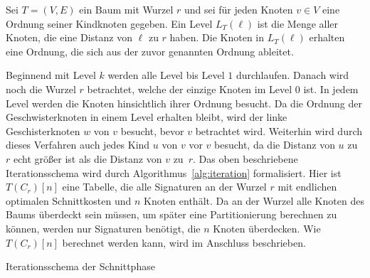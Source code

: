 \begin{defn}[Level]\label{def:level}
    Sei $T = (V,E)$ ein Baum mit Wurzel $r$ und sei für jeden Knoten $v \in V$ eine Ordnung seiner Kindknoten gegeben.
    Ein Level $L_T(\ell)$ ist die Menge aller Knoten, die eine Distanz von $\ell$ zu $r$ haben.
    Die Knoten in $L_T(\ell)$ erhalten eine Ordnung, die sich aus der zuvor genannten Ordnung ableitet.
\end{defn}

Beginnend mit Level $k$ werden alle Level bis Level $1$ durchlaufen.
Danach wird noch die Wurzel $r$ betrachtet, welche der einzige Knoten im Level $0$ ist. 
In jedem Level werden die Knoten hinsichtlich ihrer Ordnung besucht.
Da die Ordnung der Geschwisterknoten in einem Level erhalten bleibt, wird der linke Geschisterknoten $w$ von $v$ besucht, bevor $v$ betrachtet wird.
Weiterhin wird durch dieses Verfahren auch jedes Kind $u$ von $v$ vor $v$ besucht, da die Distanz von $u$ zu~$r$ echt größer ist als die Distanz von $v$ zu~$r$.
Das oben beschriebene Iterationsschema wird durch Algorithmus~\ref{alg:iteration} formalisiert.
Hier ist $T(C_r)[n]$ eine Tabelle, die alle Signaturen an der Wurzel $r$ mit endlichen optimalen Schnittkosten und $n$ Knoten enthält.
Da an der Wurzel alle Knoten des Baums überdeckt sein müssen, um später eine Partitionierung berechnen zu können, werden nur Signaturen benötigt, die $n$ Knoten überdecken.
Wie $T(C_r)[n]$ berechnet werden kann, wird im Anschluss beschrieben.

\begin{algorithm}
    \caption{Iterationsschema der Schnittphase}\label{alg:iteration}
    \begin{algorithmic}[1]
                 
                    \State {}
                \EndFor
            \EndFor
             
                \State {}
            \EndFor
             
        \EndFunction
    \end{algorithmic}
\end{algorithm}

\newcommand{\canfun}{\textproc{cut\_at\_node}}
\newcommand{\carfun}{\textproc{cut\_at\_root}}

